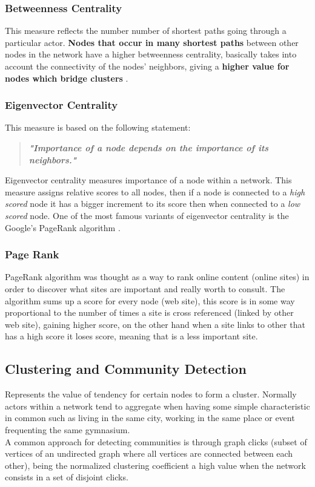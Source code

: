 \subsubsection*{Betweenness Centrality}
This measure reflects the number number of shortest paths going through a particular actor. \textbf{Nodes that
occur in many shortest paths} between other nodes in the network have a higher betweenness centrality, basically
takes into account the connectivity of the nodes' neighbors, giving a \textbf{higher value for nodes which bridge clusters} \footnotemark[2].

\subsubsection*{Eigenvector Centrality}
This measure is based on the following statement:

\begin{quote}
\textbf{\textit{"Importance of a node depends on the importance of its neighbors."}}
\end{quote}

Eigenvector centrality \footnotemark[2] measures importance of a node within a network. This measure assigns relative scores to all nodes, then if
a node is connected to a \textit{high scored} node it has a bigger increment to its score then when connected to a \textit{low scored} node.
One of the most famous variants of eigenvector centrality is the Google's PageRank algorithm \citep{brin1998anatomy}.

\subsubsection*{Page Rank}
PageRank algorithm \citep{brin1998anatomy} was thought as a way to rank online content (online sites) in order to discover
what sites are important and really worth to consult. The algorithm sums up a score for every node (web site),
this score is in some way proportional to the number of times a site is cross referenced (linked by other web site), gaining higher score,
on the other hand when a site links to other that has a high score it loses score, meaning that is a less important site.

\subsection{Clustering and Community Detection}
Represents the value of tendency for certain nodes to form a cluster. Normally actors within a network tend to aggregate when having some
simple characteristic in common such as living in the same city, working in the same place or event frequenting the same gymnasium.\\
\indent A common approach for detecting communities is through graph clicks (subset of vertices of an
undirected graph where all vertices are connected between each other), being the normalized clustering coefficient a high value
when the network consists in a set of disjoint clicks.

